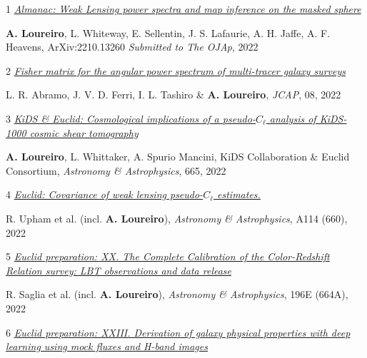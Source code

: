
\vspace{0.4cm}
\begin{cvitems}
\item[1] \textit{\href{https://arxiv.org/abs/2210.13260}{\footnotesize{Almanac: Weak Lensing power spectra and map inference on the masked sphere}} }

\footnotesize{\textbf{A. Loureiro}, L. Whiteway, E. Sellentin, J. S. Lafaurie, A. H. Jaffe, A. F. Heavens, ArXiv:2210.13260 \textit{Submitted to The OJAp}, 2022}
\item[2] \textit{\href{https://arxiv.org/abs/2204.05057}{\footnotesize{Fisher matrix for the angular power spectrum of multi-tracer galaxy surveys}} }

\footnotesize{L. R. Abramo, J. V. D. Ferri, I. L. Tashiro \& \textbf{A. Loureiro}, \textit{JCAP}, 08, 2022}
\item[3] \textit{\href{https://arxiv.org/abs/2110.06947}{\footnotesize{KiDS \& Euclid: Cosmological implications of a pseudo-$C_{\ell}$ analysis of KiDS-1000 cosmic shear tomography}} }

\footnotesize{\textbf{A. Loureiro}, L. Whittaker, A. Spurio Mancini,  KiDS Collaboration \& Euclid Consortium, \textit{Astronomy \& Astrophysics}, 665, 2022}
\item[4] \textit{\href{https://arxiv.org/abs/2112.07341}{\footnotesize{Euclid: Covariance of weak lensing pseudo-$C_{\ell}$ estimates.}}  }

\footnotesize{{R. Upham} et al. (incl. \textbf{A. Loureiro}),  \textit{Astronomy \& Astrophysics}, A114 (660), 2022}
\item[5] \textit{\href{https://arxiv.org/abs/2206.01620}{\footnotesize{Euclid preparation: XX. The Complete Calibration of the Color-Redshift Relation survey: LBT observations and data release}}  }

\footnotesize{{R. Saglia} et al. (incl. \textbf{A. Loureiro}),  \textit{Astronomy \& Astrophysics}, 196E (664A), 2022}
\item[6] \textit{\href{https://arxiv.org/abs/2206.14944}{\footnotesize{Euclid preparation: XXIII. Derivation of galaxy physical properties with deep learning using mock fluxes and H-band images}}  }


\end{cvitems}
